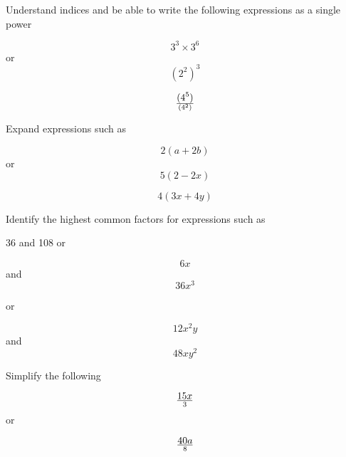 \documentclass[11pt]{article}
\begin{document}
Understand indices and be able to write the following expressions as a single power
\begin{tcolorbox}[colback=green!5!white,colframe=green!75!black]
 
\begin{equation}
3^3 \times 3^6
\end{equation}
or
\begin{equation}
(2^2)^3
\end{equation}

\begin{equation}
(4^5) \over (4^2)
\end{equation}

\end{tcolorbox}

Expand expressions such as

\begin{tcolorbox}[colback=green!5!white,colframe=green!75!black]
 
\begin{equation}
2(a+2b)
\end{equation}
or
\begin{equation}
5(2-2x)
\end{equation}

\begin{equation}
4(3x+4y)
\end{equation}

\end{tcolorbox}


Identify the highest common factors for expressions such as

\begin{tcolorbox}[colback=green!5!white,colframe=green!75!black]
 
36 and 108 \newline
or \newline

$$ 6x $$  and $$ 36x^3 $$

or \newline

$$   12x^2y  $$  and $$  48xy^2 $$


\end{tcolorbox}


Simplify the following


\begin{tcolorbox}[colback=green!5!white,colframe=green!75!black]
 
$$     15x \over 3 $$ \newline
or \newline

$$ 40a \over 8 $$   \newline


\end{tcolorbox}
\end{document}
